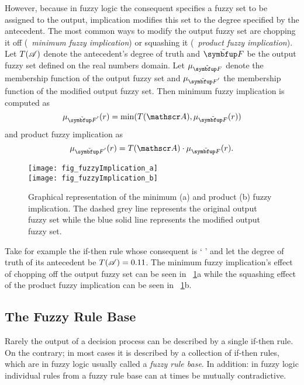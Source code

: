 However, because in fuzzy logic the consequent specifies a fuzzy set to be assigned to the output, implication modifies this set to the degree specified by the antecedent. The most common ways to modify the output fuzzy set are chopping it off (\ie\ \emph{minimum fuzzy implication}) or squashing it (\ie\ \emph{product fuzzy implication}). Let $T(\mathscr{A})$ denote the antecedent's degree of truth and $\fset{F}$ be the output fuzzy set defined on the real numbers domain. Let $\mu_\fset{F}$ denote the membership function of the output fuzzy set and $\mu_{\fset{F}'}$ the membership function of the modified output fuzzy set. Then minimum fuzzy implication is computed as
%
\begin{equation} 
	\mu_{\fset{F}'}(r)=\min(T(\statement{A}),\mu_\fset{F}(r))
\end{equation}
%
and product fuzzy implication as
%
\begin{equation}
	\mu_{\fset{F}'}(r)=T(\statement{A})\cdot\mu_\fset{F}(r).
\end{equation}

\begin{figure}
	\texttt{[image: fig\_fuzzyImplication\_a]}\\
	\vspace*{2mm}
	\texttt{[image: fig\_fuzzyImplication\_b]}
	\caption{Graphical representation of the minimum (a) and product (b) fuzzy implication. The dashed grey line represents the original output fuzzy set while the blue solid line represents the modified output fuzzy set.}
	\label{fig:implication}
\end{figure}

Take for example the if-then rule whose consequent is `  ' and let the degree of truth of its antecedent be $T(\mathscr{A})=0.11$. The minimum fuzzy implication's effect of chopping off the output fuzzy set can be seen in \fig~\ref{fig:implication}a while the squashing effect of the product fuzzy implication can be seen in \fig~\ref{fig:implication}b. 

\subsection{The Fuzzy Rule Base}
\label{subsec:fuzzyModelling:fuzzyRuleBase}
Rarely the output of a decision process can be described by a single if-then rule. On the contrary; in most cases it is described by a collection of if-then rules, which are in fuzzy logic usually called a \emph{fuzzy rule base}. In addition: in fuzzy logic individual rules from a fuzzy rule base can at times be mutually contradictive. 

